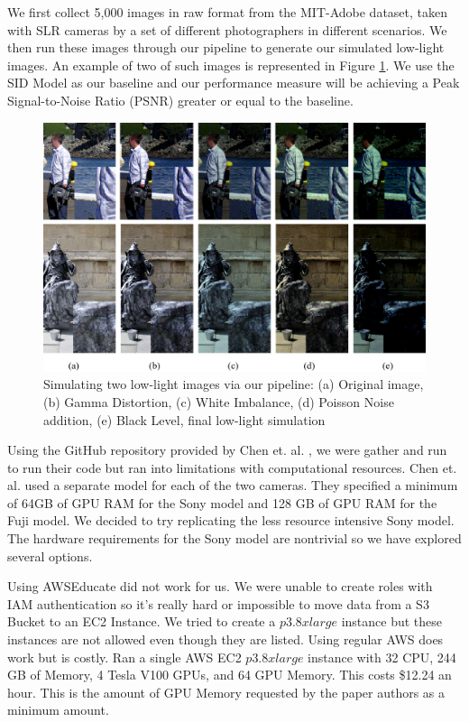 \documentclass{article}
\begin{document}
We first collect 5,000 images in raw format from the MIT-Adobe dataset, taken with SLR cameras by a set of different photographers in different scenarios. We then run these images through our pipeline to generate our simulated low-light images. An example of two of such images is represented in
Figure \ref{fig:simulate}. We use the SID Model as our baseline and our
performance measure will be achieving a Peak Signal-to-Noise Ratio (PSNR)
greater or equal to the baseline.


\begin{figure}[ht]
  \centering
  \includegraphics[scale=0.3]{fig3.png}
  \caption{Simulating two low-light images via our pipeline: (a) Original
    image, (b) Gamma Distortion, (c) White Imbalance, (d) Poisson Noise addition, (e) Black Level, final low-light simulation}
  \label{fig:simulate}
\end{figure}

Using the GitHub repository provided by Chen et. al. \cite{chen2018learning},
we were gather and run to run their code but ran into limitations with computational
resources. Chen et. al. \cite{chen2018learning} used a separate model for
each of the two cameras. They specified a minimum of 64GB of GPU RAM for the
Sony model and 128 GB of GPU RAM for the Fuji model. We decided to try
replicating the less resource intensive Sony model. The hardware
requirements for the Sony model are nontrivial so we have explored
several options.\newline

Using AWSEducate did not work for us. We were unable to create roles with
IAM authentication so it's really hard or impossible to move data from a
S3 Bucket to an EC2 Instance. We tried to create a $p3.8xlarge$ instance but
these instances are not allowed even though they are listed. Using regular
AWS does work but is costly. Ran a single AWS EC2 $p3.8xlarge$ instance
with 32 CPU, 244 GB of Memory, 4 Tesla V100 GPUs, and 64 GPU Memory. This
costs \$12.24 an hour. This is the amount of GPU Memory requested by the
paper authors as a minimum amount. \newline
\end{document}
